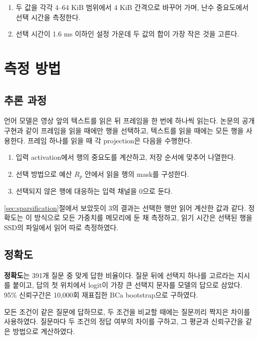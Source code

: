 \begin{enumerate}
\item 두 값을 각각 4--64 KiB 범위에서 4 KiB 간격으로 바꾸어 가며, 난수 중요도에서 선택 시간을 측정한다.
\item 선택 시간이 1.6 ms 이하인 설정 가운데 두 값의 합이 가장 작은 것을 고른다.
\end{enumerate}

\section{측정 방법}\label{sec:exp-measure}

\subsection{추론 과정}\label{sec:exp-inference}

언어 모델은 영상 앞의 텍스트를 읽은 뒤 프레임을 한 번에 하나씩 읽는다. 논문의 공개 구현과 같이 프레임을 읽을 때에만 행을 선택하고, 텍스트를 읽을 때에는 모든 행을 사용한다. 프레임 하나를 읽을 때 각 projection은 다음을 수행한다.

\begin{enumerate}
\item 입력 activation에서 행의 중요도를 계산하고, 저장 순서에 맞추어 나열한다.
\item 선택 방법으로 예산 $R_p$ 안에서 읽을 행의 mask를 구성한다.
\item 선택되지 않은 행에 대응하는 입력 채널을 0으로 둔다.
\end{enumerate}

\ref{sec:sparsification}절에서 보았듯이 3의 결과는 선택한 행만 읽어 계산한 값과 같다. 정확도는 이 방식으로 모든 가중치를 메모리에 둔 채 측정하고, 읽기 시간은 선택된 행을 SSD의 파일에서 읽어 따로 측정하였다.

\subsection{정확도}\label{sec:exp-accuracy}

\textbf{정확도}는 391개 질문 중 맞게 답한 비율이다. 질문 뒤에 선택지 하나를 고르라는 지시를 붙이고, 답의 첫 위치에서 logit이 가장 큰 선택지 문자를 모델의 답으로 삼았다. 95\% 신뢰구간은 10,000회 재표집한 BCa bootstrap으로 구하였다.

모든 조건이 같은 질문에 답하므로, 두 조건을 비교할 때에는 질문끼리 짝지은 차이를 사용하였다. 질문마다 두 조건의 정답 여부의 차이를 구하고, 그 평균과 신뢰구간을 같은 방법으로 계산하였다.

